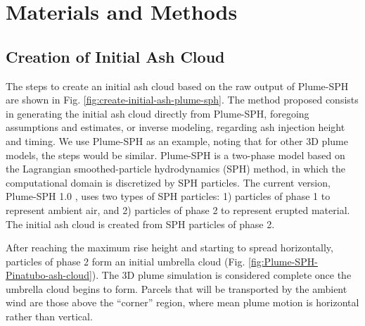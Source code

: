 \documentclass[utf8]{frontiersSCNS} %
\begin{document}
\section{Materials and Methods} \label{sec:Methodology}

\subsection{Creation of Initial Ash Cloud} \label{sec:create-initial-condition}
The steps to create an initial ash cloud based on the raw output of Plume-SPH are shown in Fig. \ref{fig:create-initial-ash-plume-sph}.
The method proposed consists in generating the initial ash cloud directly from Plume-SPH, foregoing assumptions and estimates, or inverse modeling, regarding ash injection height and timing.
We use Plume-SPH as an example, noting that for other 3D plume models, the steps would be similar. Plume-SPH is a two-phase model based on the Lagrangian smoothed-particle hydrodynamics (SPH) method, in which the computational domain is discretized by SPH particles. The current version, Plume-SPH 1.0 \citep{cao2018plume}, uses two types of SPH particles: 1) particles of phase 1 to represent ambient air, and 2) particles of phase 2 to represent erupted material. The initial ash cloud is created from SPH particles of phase 2.

After reaching the maximum rise height and starting to spread horizontally, particles of phase 2 form an initial umbrella cloud (Fig. \ref{fig:Plume-SPH-Pinatubo-ash-cloud}). The 3D plume simulation is considered complete once the umbrella cloud begins to form. Parcels that will be transported by the ambient wind are those above the ``corner'' region, where mean plume motion is horizontal rather than vertical.
\end{document}
